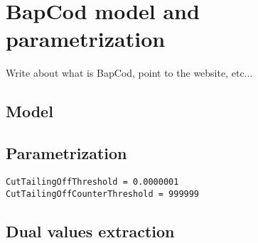 \chapter{BapCod model and parametrization}

Write about what is BapCod, point to the website, etc...

\section{Model}



\section{Parametrization}

\begin{verbatim}
CutTailingOffThreshold = 0.0000001
CutTailingOffCounterThreshold = 999999
\end{verbatim}

\section{Dual values extraction}
